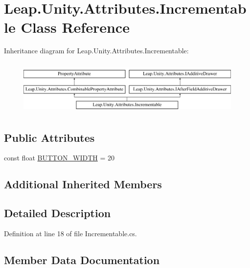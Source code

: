 \hypertarget{class_leap_1_1_unity_1_1_attributes_1_1_incrementable}{}\section{Leap.\+Unity.\+Attributes.\+Incrementable Class Reference}
\label{class_leap_1_1_unity_1_1_attributes_1_1_incrementable}
Inheritance diagram for Leap.\+Unity.\+Attributes.\+Incrementable\+:\begin{figure}[H]
\begin{center}
\leavevmode
\includegraphics[height=2.772277cm]{class_leap_1_1_unity_1_1_attributes_1_1_incrementable}
\end{center}
\end{figure}
\subsection*{Public Attributes}
\begin{DoxyCompactItemize}
\item 
const float \mbox{\hyperlink{class_leap_1_1_unity_1_1_attributes_1_1_incrementable_abd37d12859b6d06e5f3352c37c2e1be4}{B\+U\+T\+T\+O\+N\+\_\+\+W\+I\+D\+TH}} = 20
\end{DoxyCompactItemize}
\subsection*{Additional Inherited Members}


\subsection{Detailed Description}


Definition at line 18 of file Incrementable.\+cs.



\subsection{Member Data Documentation}
\mbox{\label{class_leap_1_1_unity_1_1_attributes_1_1_incrementable_abd37d12859b6d06e5f3352c37c2e1be4}} 
